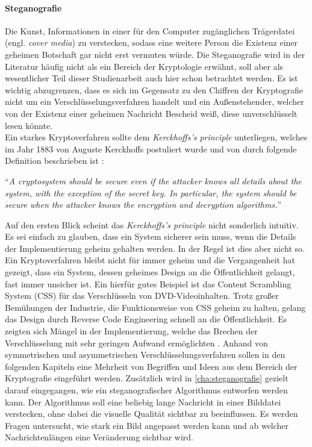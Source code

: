 \paragraph{Steganografie}
Die Kunst, Informationen in einer für den Computer
zugänglichen Trä\-gerdatei (engl. \textit{cover media}) zu verstecken, sodass eine
weitere Person die Existenz einer geheimen Botschaft gar nicht erst vermuten würde.
Die Steganografie wird in der Literatur häufig nicht als ein Bereich der Kryptologie
erwähnt, soll aber als wesentlicher Teil dieser Studienarbeit auch hier
schon betrachtet werden. Es ist wichtig abzugrenzen, dass es sich
im Gegensatz zu den Chiffren der Kryptografie nicht um ein Verschlüsselungsverfahren handelt
und ein Außenstehender, welcher von der Existenz einer geheimen Nachricht Bescheid weiß,
diese unverschlüsselt lesen könnte.\\

\noindent
Ein starkes Kryptoverfahren sollte dem \textit{Kerckhoffs's principle} unterliegen, welches
im Jahr 1883 von Auguste Kerckhoffs postuliert wurde und von \citeauthor{BOOK:crypto}
durch folgende Definition beschrieben ist \parencite*[11]{BOOK:crypto}:

\begin{definition}
  \enquote{\textit{A cryptosystem should be secure even if the attacker knows all details about
      the system, with the exception of the secret key. In particular, the system should be secure when
      the attacker knows the encryption and decryption algorithms.}}
\end{definition}

\noindent
Auf den ersten Blick scheint das \textit{Kerckhoffs's principle} nicht sonderlich intuitiv.
Es sei einfach zu glauben, dass ein System
sicherer sein muss, wenn die Details der Implementierung geheim gehalten werden.
In der Regel ist dies aber nicht so. Ein Kryptoverfahren bleibt nicht für immer geheim und die
Vergangenheit hat gezeigt, dass ein System, dessen geheimes Design an die Öffentlichkeit
gelangt, fast immer unsicher ist. Ein hierfür gutes Beispiel ist das Content Scrambling System (CSS)
für das Verschlüsseln von DVD-Videoinhalten. Trotz großer Bemühungen der Industrie, die
Funktionsweise von CSS geheim zu halten, gelang das Design durch Reverse Code Engineering
schnell an die Öffentlichkeit. Es zeigten sich Mängel in der Implementierung,
welche das Brechen der Verschlüsselung mit sehr geringen Aufwand ermöglichten \parencite{SITE:CSS}.
Anhand von symmetrischen und asymmetrischen Verschlüsselungsverfahren
sollen in den folgenden Kapiteln eine Mehrheit von Begriffen und Ideen aus dem
Bereich der Kryptografie eingeführt werden.
Zusätzlich wird in \autoref{cha:steganografie} gezielt darauf eingegangen,
wie ein steganografischer Algorithmus entworfen werden kann.
Der Algorithmus soll eine beliebig lange Nachricht in einer Bilddatei verstecken,
ohne dabei die visuelle Qualität sichtbar zu beeinflussen. Es werden Fragen untersucht,
wie stark ein Bild angepasst werden kann und ab welcher Nachrichtenlängen
eine Veränderung sichtbar wird.

